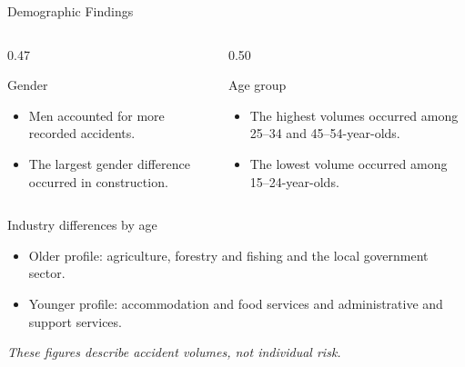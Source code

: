 \documentclass[aspectratio=169]{beamer}
\begin{document}
\begin{frame}{Demographic Findings} \small \begin{columns}[T,onlytextwidth] \begin{column}{0.47\textwidth} \begin{block}{Gender} \begin{itemize} \setlength{\itemsep}{0.08cm} \item \alert{Men} accounted for more recorded accidents. \item The largest gender difference occurred in \alert{construction}. \end{itemize} \end{block} \end{column} \begin{column}{0.50\textwidth} \begin{block}{Age group} \begin{itemize} \setlength{\itemsep}{0.08cm} \item The highest volumes occurred among \alert{25--34} and \alert{45--54-year-olds}. \item The lowest volume occurred among \alert{15--24-year-olds}. \end{itemize} \end{block} \end{column} \end{columns} \vspace{0.15cm} \begin{block}{Industry differences by age} \begin{itemize} \setlength{\itemsep}{0.08cm} \item Older profile: \alert{agriculture, forestry and fishing} and the \alert{local government sector}. \item Younger profile: \alert{accommodation and food services} and \alert{administrative and support services}. \end{itemize} \end{block} \vspace{0.1cm} \centering \footnotesize \textit{These figures describe accident volumes, not individual risk.} \end{frame}
\end{document}
